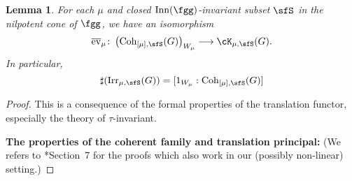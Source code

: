 \documentclass[12pt,a4paper]{amsart}
\numberwithin{equation}{section}
\newtheorem{lem}[thm]{Lemma}
\theoremstyle{remark}
\def\Irr{\mathrm{Irr}}
\def\Coh{\mathrm{Coh}}
\def\bev#1{\overline{\mathrm{ev}}_{#1}}
\def\Inn{\mathrm{Inn}}
\newcommand{\Grt}{\cK}
\begin{document}
\begin{lem}\label{lem:coh.count}
  For each $\mu$ and closed $\Inn(\fgg)$-invariant subset $\sfS$ in the
  nilpotent cone of $\fgg$, we have an isomorphism
  \[
    \bev{\mu}\colon \left(\Coh_{[\mu],\sfS}(G)\right)_{W_{\mu}} \longrightarrow \Grt_{\mu,\sfS}(G).
  \]
  In particular,
  \[
    \sharp(\Irr_{\mu,\sfS}(G)) = [1_{W_{\mu}}:\Coh_{[\mu],\sfS}(G)]
  \]
\end{lem}
\begin{proof}
  This is a consequence of the formal properties of the translation functor,
  especially the theory of $\tau$-invariant.

  \def\Parm{\mathrm{Parm}} \def\cof{\Phi}

  {\bf The properties of the coherent family and translation principal:} (We
  refers to \cite{Vg}*{Section~7} for the proofs which also work in our
  (possibly non-linear) setting.)


\end{proof}
\end{document}
